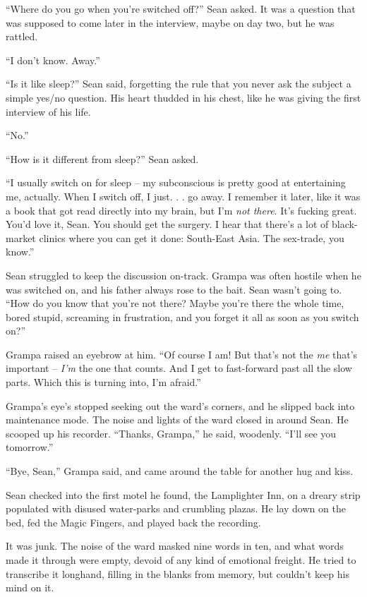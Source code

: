 “Where do you go when you're switched off?” Sean asked. It was a 
question that was supposed to come later in the interview, maybe on day 
two, but he was rattled.

“I don't know. Away.”

“Is it like sleep?” Sean said, forgetting the rule that you never 
ask the subject a simple yes/no question. His heart thudded in his 
chest, like he was giving the first interview of his life.

“No.”

“How is it different from sleep?” Sean asked.

“I usually switch on for sleep -- my subconscious is pretty good at 
entertaining me, actually. When I switch off, I just. . . go away. I 
remember it later, like it was a book that got read directly into my 
brain, but I'm \emph{not there}. It's fucking great. You'd love it, 
Sean. You should get the surgery. I hear that there's a lot of 
black-market clinics where you can get it done: South-East Asia. The 
sex-trade, you know.”

Sean struggled to keep the discussion on-track. Grampa was often 
hostile when he was switched on, and his father always rose to the 
bait. Sean wasn't going to. “How do you know that you're not there? 
Maybe you're there the whole time, bored stupid, screaming in 
frustration, and you forget it all as soon as you switch on?”

Grampa raised an eyebrow at him. “Of course I am! But that's not the 
\emph{me} that's important -- \emph{I'm} the one that counts. And I get 
to fast-forward past all the slow parts. Which this is turning into, 
I'm afraid.”

Grampa's eye's stopped seeking out the ward's corners, and he slipped 
back into maintenance mode. The noise and lights of the ward closed in 
around Sean. He scooped up his recorder. “Thanks, Grampa,” he said, 
woodenly. “I'll see you tomorrow.”

“Bye, Sean,” Grampa said, and came around the table for another hug 
and kiss.

\tb

Sean checked into the first motel he found, the Lamplighter Inn, on a 
dreary strip populated with disused water-parks and crumbling plazas. 
He lay down on the bed, fed the Magic Fingers, and played back the 
recording.

It was junk. The noise of the ward masked nine words in ten, and what 
words made it through were empty, devoid of any kind of emotional 
freight. He tried to transcribe it longhand, filling in the blanks from 
memory, but couldn't keep his mind on it.

